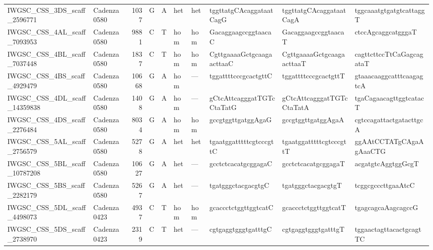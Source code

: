\begin{longtable}{llrlllllll}
 IWGSC\_CSS\_3DS\_scaff\_2596771  & Cadenza0580 &       1037 & G         & A        & het            & het         & tggttatgCAcaggataatCagG   & tggttatgCAcaggataatCagA   & tggcaaatgtgatgtcattaggT   \\
 IWGSC\_CSS\_4AL\_scaff\_7093953  & Cadenza0580 &       9881 & C         & T        & hom            & hom         & GacaggaagccggtaacaC       & GacaggaagccggtaacaT       & ctccAgcaggcatgggaT        \\
 IWGSC\_CSS\_4BL\_scaff\_7037448  & Cadenza0580 &       1837 & C         & T        & hom            & hom         & CgttgaaaaGctgcaagaacttaaC & CgttgaaaaGctgcaagaacttaaT & cagttcttccTtCaGagcagataT  \\
 IWGSC\_CSS\_4BS\_scaff\_4929479  & Cadenza0580 &      10668 & G         & A        & hom            & ---         & tggattttcccgcactgttC      & tggattttcccgcactgttT      & gtaaacaaggcatttcaagagtcA  \\
 IWGSC\_CSS\_4DL\_scaff\_14359838 & Cadenza0580 &       1408 & G         & A        & hom            & ---         & gCtcAttcagggatTGTcCtaTatG & gCtcAttcagggatTGTcCtaTatA & tgaCagaacagttggtcatacT    \\
 IWGSC\_CSS\_4DS\_scaff\_2276484  & Cadenza0580 &       8034 & G         & A        & hom            & hom         & gccgtggttgatggAgaG        & gccgtggttgatggAgaA        & cgtccagattactgatacttgcA   \\
 IWGSC\_CSS\_5AL\_scaff\_2756579  & Cadenza0580 &       5278 & G         & A        & het            & het         & tgaatggatttttcgtcccgttC   & tgaatggatttttcgtcccgttT   & ggAAtCCTATgCAgaAgAaaCTG   \\
 IWGSC\_CSS\_5BL\_scaff\_10787208 & Cadenza0580 &      10627 & G         & A        & het            & ---         & gcctctcacatgcggagaC       & gcctctcacatgcggagaT       & acgatgtcAggtggGcgT        \\
 IWGSC\_CSS\_5BS\_scaff\_2282179  & Cadenza0580 &       5267 & G         & A        & het            & ---         & tgatgggctacgacgtgC        & tgatgggctacgacgtgT        & tcggcgcccttgaaAtcC        \\
 IWGSC\_CSS\_5DL\_scaff\_4498073  & Cadenza0423 &       4937 & C         & T        & hom            & hom         & gcaccctctggttggtcatC      & gcaccctctggttggtcatT      & tgagcagcaAagcagccG        \\
 IWGSC\_CSS\_5DS\_scaff\_2738970  & Cadenza0423 &       2319 & C         & T        & het            & ---         & cgtgaggtgggtgatttgC       & cgtgaggtgggtgatttgT       & tggaactagttacactgcagtTC   \\

\end{longtable}
